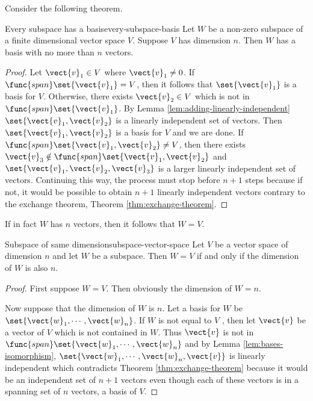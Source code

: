 Consider the following theorem. 

\begin{theorem}{Every subspace has a basis}{every-subspace-basis}
Let $W$ be a non-zero subspace of a finite dimensional vector
space $V$. Suppose $V$ has dimension $n$.
Then $W$ has a basis
with no more than $n$ vectors.
\end{theorem}

\begin{proof}
Let $\vect{v}_{1}\in V$ where $\vect{v}_{1}\neq 0$. If $
\func{span}\set{\vect{v}_{1}} =V$, then it follows that $\set{\vect{v}
_{1}} $ is a basis for $V$. Otherwise, there exists $\vect{v}
_{2}\in V$ which is not in $\func{span}\set{\vect{v}_{1}}$. By
Lemma \ref{lem:adding-linearly-independent} $\set{\vect{v}_{1},\vect{v}_{2}} $ is a
linearly independent set of vectors. Then $\set{\vect{v}_{1},\vect{v}
_{2}} $ is a basis for $V$ and we are done. If $\func{span}\set{\vect{v}_{1},
\vect{v}_{2}} \neq V$, then there exists $\vect{v}_{3}\notin \func{
span}\set{\vect{v}_{1},\vect{v}_{2}} $ and $\set{\vect{v}
_{1},\vect{v}_{2},\vect{v}_{3}} $ is a larger linearly
independent set of vectors. Continuing this way, the process must stop
before $n+1$ steps because if not, it would be possible to obtain $n+1$
linearly independent vectors contrary to the exchange theorem, Theorem \ref{thm:exchange-theorem}. 
\end{proof}

If in fact $W$ has $n$ vectors, then it follows that $W=V$. 

\begin{theorem}{Subspace of same dimension}{subspace-vector-space}
Let $V$ be a vector space of dimension $n$ and let $W$ be a
subspace. Then $W=V$ if and only if the dimension of $W$ is also $n$.
\end{theorem}

\begin{proof}First suppose $W=V$. Then obviously the dimension of $W=n$.

Now suppose that the dimension of $W$ is $n$. Let a basis for $W$ be $
\set{\vect{w}_{1},\cdots ,\vect{w}_{n}}$. If $W$ is not equal to $V$
, then let $\vect{v}$ be a vector of $V$ which is not contained in $W$. Thus $
\vect{v}$ is not in $\func{span}\set{\vect{w}_{1},\cdots ,\vect{w}
_{n}} $ and by Lemma \ref{lem:bases-isomorphism}, $\set{\vect{w}_{1},\cdots ,\vect{w}_{n},\vect{v}} $ is linearly independent which contradicts
Theorem \ref{thm:exchange-theorem} because it would be an independent set of $n+1$
vectors even though each of these vectors is in a spanning set of $n$
vectors, a basis of $V$. 
\end{proof}


